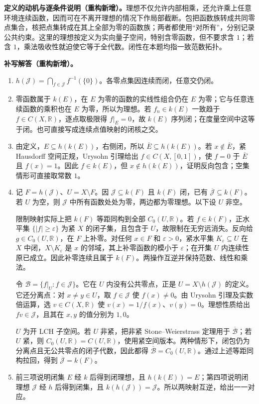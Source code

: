 \documentclass[../../main.tex]{subfiles}%
\begin{document}
\begin{remark}
\textbf{定义的动机与逐条件说明（重构新增）。}理想不仅允许内部相乘，还允许乘上任意环境连续函数，因而可在不离开理想的情况下作局部截断。包把函数族转成共同零点集合，核把点集转成在其上全部为零的函数族；两者都使用“对所有”，分别记录公共约束。这里的理想按定义为实向量子空间，特别含零函数，但不要求含 $1$；若含 $1$，乘法吸收性就迫使它等于全代数。闭性在本题均指一致范数拓扑。
\end{remark}
\begin{solution}
\textbf{补写解答（重构新增）。}
\begin{enumerate}
\item $h(\mathcal J)=\bigcap_{f\in\mathcal J}f^{-1}(\{0\})$。各零点集因连续而闭，任意交仍闭。
\item 零函数属于 $k(E)$，在 $E$ 为零的函数的实线性组合仍在 $E$ 为零；它与任意连续函数的乘积也在 $E$ 为零，所以为理想。若 $f_n\in k(E)$ 一致趋于 $f\in C(X,\mathbb R)$，逐点取极限得 $f|_E=0$，故 $k(E)$ 序列闭；在度量空间中这等于闭。也可直接写成连续点值映射的闭核之交。
\item 由定义，$E\subseteq h(k(E))$，右侧闭，所以 $\overline E\subseteq h(k(E))$。若 $x\notin\overline E$，紧 Hausdorff 空间正规，Urysohn 引理给出 $f\in C(X,[0,1])$，使 $f=0$ 于 $\overline E$ 且 $f(x)=1$。因此 $f\in k(E)$，但 $x\notin h(k(E))$，证明反向包含；空集情形可直接取常数 $1$。
\item 记 $F=h(\mathcal J)$、$U=X\setminus F$。因 $\mathcal J\subseteq k(F)$ 且 $k(F)$ 闭，已有 $\overline{\mathcal J}\subseteq k(F)$。若 $U$ 为空，则 $\mathcal J$ 中所有函数处处为零，两边都为零理想。以下设 $U$ 非空。

限制映射实际上把 $k(F)$ 等距同构到全部 $C_0(U,\mathbb R)$。若 $f\in k(F)$，正水平集 $\{|f|\ge\varepsilon\}$ 为紧 $X$ 的闭子集，且包含于 $U$，故限制在无穷远消失。反向给 $g\in C_0(U,\mathbb R)$，在 $F$ 上补零。对任何 $x\in F$ 和 $\varepsilon>0$，紧水平集 $K_\varepsilon\subseteq U$ 在 $X$ 中闭，$X\setminus K_\varepsilon$ 是 $x$ 的邻域，其上补零函数的模小于 $\varepsilon$；在开集 $U$ 内连续性原已成立。因此补零连续且属于 $k(F)$。两操作互逆并保持范数、线性和乘法。

令 $\mathcal B=\{f|_U:f\in\mathcal J\}$。它在 $U$ 内没有公共零点，正是 $U=X\setminus h(\mathcal J)$ 的定义。它还分离点：对 $x\ne y\in U$，取 $f\in\mathcal J$ 使 $f(x)\ne0$。由 Urysohn 引理及实数倍运算，选 $v\in C(X,\mathbb R)$ 使 $v(x)=1/f(x)$、$v(y)=0$。理想性质给出 $fv\in\mathcal J$，且其在 $x,y$ 的值分别为 $1,0$。

$U$ 为开 LCH 子空间。若 $U$ 非紧，把非紧 Stone--Weierstrass 定理用于 $\overline{\mathcal B}$；若 $U$ 紧，则 $C_0(U,\mathbb R)=C(U,\mathbb R)$，使用紧空间版本。两种情形下，闭包仍为分离点且无公共零点的闭子代数，因此都得 $\overline{\mathcal B}=C_0(U,\mathbb R)$。通过上述等距同构拉回，得到 $\overline{\mathcal J}=k(F)$。
\item 前三项说明闭集 $E$ 经 $k$ 后得到闭理想，且 $h(k(E))=E$；第四项说明闭理想 $\mathcal J$ 经 $h$ 后得到闭集，且 $k(h(\mathcal J))=\mathcal J$。所以两映射互逆，给出一一对应。
\end{enumerate}
\end{solution}
\end{document}
